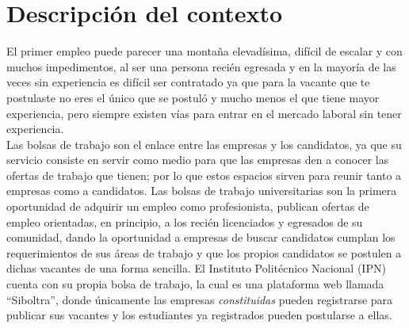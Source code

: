\clearpage
\section{Descripción del contexto}
El primer empleo puede parecer una montaña elevadísima, difícil de escalar y con muchos impedimentos, al ser una persona recién egresada y en la mayoría de las veces sin experiencia es difícil ser contratado ya que para la vacante que te postulaste no eres el único que se postuló y mucho menos el que tiene mayor experiencia, pero siempre existen vías para entrar en el mercado laboral sin tener experiencia. \\
\newline
Las bolsas de trabajo son el enlace entre las empresas y los candidatos, ya que su servicio consiste en servir como medio para que las empresas den a conocer las ofertas de trabajo que tienen; por lo que estos espacios sirven para reunir tanto a empresas como a candidatos.\cite{Occ3}
Las bolsas de trabajo universitarias son la primera oportunidad de adquirir un empleo como profesionista, publican ofertas de empleo orientadas, en principio, a los recién licenciados y egresados de su comunidad, dando la oportunidad a empresas de buscar candidatos cumplan los requerimientos de sus áreas de trabajo y que los propios candidatos se postulen a dichas vacantes de una forma sencilla.\cite{Universia}  
\newline
El Instituto Politécnico Nacional (IPN) cuenta con su propia bolsa de trabajo, la cual es una plataforma web llamada ``Siboltra'', donde únicamente las empresas \textit{constituidas} pueden registrarse para publicar sus vacantes y los estudiantes ya registrados pueden postularse a ellas. 
